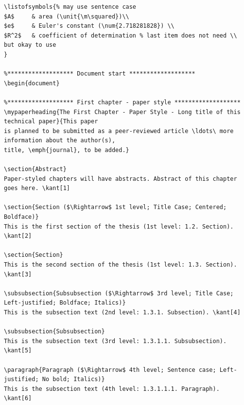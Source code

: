 \documentclass[letterpaper]{refart}
\begin{document}
{\begin{verbatim}
\listofsymbols{% may use sentence case
$A$     & area (\unit{\m\squared})\\
$e$     & Euler's constant (\num{2.718281828}) \\
$R^2$   & coefficient of determination % last item does not need \\  but okay to use
}

%******************* Document start *******************
\begin{document}

%******************* First chapter - paper style *******************
\mypaperheading{The First Chapter - Paper Style - Long title of this technical paper}{This paper 
is planned to be submitted as a peer-reviewed article \ldots\ more information about the author(s),  
title, \emph{journal}, to be added.}

\section{Abstract}
Paper-styled chapters will have abstracts. Abstract of this chapter goes here. \kant[1]

\section{Section ($\Rightarrow$ 1st level; Title Case; Centered; Boldface)}
This is the first section of the thesis (1st level: 1.2. Section). \kant[2]

\section{Section}
This is the second section of the thesis (1st level: 1.3. Section). \kant[3]

\subsubsection{Subsubsection ($\Rightarrow$ 3rd level; Title Case; Left-justified; Boldface; Italics)}
This is the subsection text (2nd level: 1.3.1. Subsection). \kant[4]

\subsubsection{Subsubsection}
This is the subsection text (3rd level: 1.3.1.1. Subsubsection). \kant[5]

\paragraph{Paragraph ($\Rightarrow$ 4th level; Sentence case; Left-justified; No bold; Italics)}
This is the subsection text (4th level: 1.3.1.1.1. Paragraph). \kant[6]


\end{verbatim}}
\end{document}
